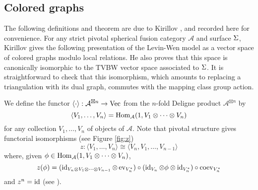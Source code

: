 \newcommand{\ee}{\mathbf{e}}       %
\newcommand{\A}{\mathcal{A}}      %
\newcommand{\st}{\; | \;}                               %
\newcommand{\ttt}{\otimes}                              %
\newcommand{\cc}[1]{\underset{\scriptstyle #1}{\circ}}
\newcommand{\ccc}[1]{\underset{\scriptstyle #1}{\bullet}}
\newcommand{\ti}{\tilde}
\newcommand{\ov}{\overline}
\newcommand{\del}{\partial}
\newcommand{\<}{\langle}
\renewcommand{\>}{\rangle}
\newcommand{\surjto}{\twoheadrightarrow}      %
\newcommand{\injto}{\hookrightarrow}          %
\newcommand{\isoto}{\xrightarrow {\sim}}       %
\newcommand{\xxto}{\xrightarrow}              %
\newcommand{\firef}[1]{Figure~{\rm\ref{#1}}}
\newcommand{\R}{\mathbb{R}}       %


\subsection{Colored graphs}\label{s:colored}

The following definitions and theorem are due to Kirillov
\cite{kirillovStringNets}, and recorded here for convenience.  For any
strict pivotal spherical fusion category $\mathcal A$ and surface $\Sigma$,
Kirillov gives the
following presentation of the Levin-Wen model as a vector space of
colored graphs modulo local relations.  He also proves that this space
is canonically isomorphic to the TVBW vector space associated to
$\Sigma$.  It is straightforward to check that this isomorphism, which
amounts to replacing a triangulation with its dual graph, commutes
with the mapping class group action.


We define the functor $\< \cdot \> : \A^{\boxtimes n}\to \Vect$ from the $n$-fold Deligne product $\A^{\boxtimes n}$ by
\begin{equation}\label{e:vev}
\<V_1,\dots,V_n\>=\Hom_\A(\one,
V_1\otimes\dots\otimes V_n)
\end{equation}
for any collection $V_1,\dots, V_n$ of objects of $\A$. Note that pivotal
structure gives functorial isomorphisms (see Figure \ref{fig:z})
\begin{equation}\label{e:cyclic}
z\colon\<V_1,\dots,V_n\>\cong \<V_n, V_1,\dots,V_{n-1}\>
\end{equation}
where, given $\phi \in \Hom_\A(\one,
V_1\otimes\dots\otimes V_n)$,
$$z(\phi)= ( \operatorname{id}_{V_n \otimes V_1 \otimes \cdots \otimes V_{n-1}} \otimes \operatorname{ev}_{V_n^*} ) \circ (\operatorname{id}_{V_n} \otimes \phi \otimes \operatorname{id}_{V_n^*} ) \circ  \operatorname{coev}_{V_n^*}  $$ 
and $z^n=\operatorname{id}$ (see \cite[Section 5.3]{BK}).



